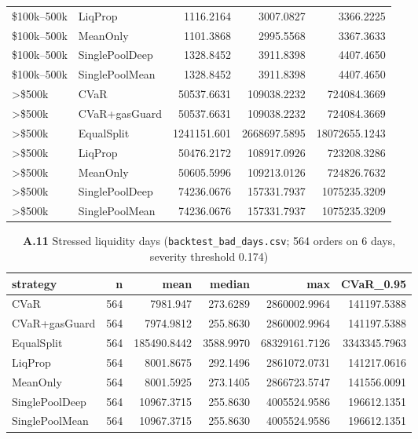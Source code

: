 \documentclass[11pt,a4paper]{article}
\theoremstyle{remark}
\newcommand{\code}[1]{\texttt{#1}}
\begin{document}
\begin{landscape}
\begin{table}[H]
\begin{tabular}{@{}llrrr@{}}
\$100k--500k & LiqProp & 1116.2164 & 3007.0827 & 3366.2225 \\
\$100k--500k & MeanOnly & 1101.3868 & 2995.5568 & 3367.3633 \\
\$100k--500k & SinglePoolDeep & 1328.8452 & 3911.8398 & 4407.4650 \\
\$100k--500k & SinglePoolMean & 1328.8452 & 3911.8398 & 4407.4650 \\
>\$500k & CVaR & 50537.6631 & 109038.2232 & 724084.3669 \\
>\$500k & CVaR+gasGuard & 50537.6631 & 109038.2232 & 724084.3669 \\
>\$500k & EqualSplit & 1241151.601 & 2668697.5895 & 18072655.1243 \\
>\$500k & LiqProp & 50476.2172 & 108917.0926 & 723208.3286 \\
>\$500k & MeanOnly & 50605.5996 & 109213.0126 & 724826.7632 \\
>\$500k & SinglePoolDeep & 74236.0676 & 157331.7937 & 1075235.3209 \\
>\$500k & SinglePoolMean & 74236.0676 & 157331.7937 & 1075235.3209 \\
\bottomrule
\end{tabular}
\end{table}

\begin{table}[H]
\centering
\caption*{\textbf{A.11} Stressed liquidity days (\code{backtest\_bad\_days.csv}; 564
orders on 6 days, severity threshold 0.174)}
\scriptsize
\begin{tabular}{@{}lrrrrr@{}}
\toprule
strategy & n & mean & median & max & CVaR\_0.95 \\
\midrule
CVaR & 564 & 7981.947 & 273.6289 & 2860002.9964 & 141197.5388 \\
CVaR+gasGuard & 564 & 7974.9812 & 255.8630 & 2860002.9964 & 141197.5388 \\
EqualSplit & 564 & 185490.8442 & 3588.9970 & 68329161.7126 & 3343345.7963 \\
LiqProp & 564 & 8001.8675 & 292.1496 & 2861072.0731 & 141217.0616 \\
MeanOnly & 564 & 8001.5925 & 273.1405 & 2866723.5747 & 141556.0091 \\
SinglePoolDeep & 564 & 10967.3715 & 255.8630 & 4005524.9586 & 196612.1351 \\
SinglePoolMean & 564 & 10967.3715 & 255.8630 & 4005524.9586 & 196612.1351 \\
\bottomrule
\end{tabular}
\end{table}


\end{landscape}
\end{document}

